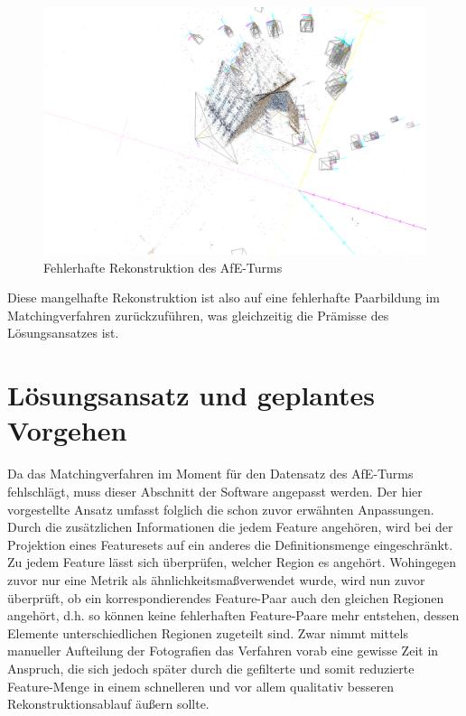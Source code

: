 \begin{figure}[h]
\centering
\includegraphics[height=0.3\textheight]{gfx/falscherekon1invert.png}
\caption[Fehlerhafte Rekonstruktion des AfE-Turms]{Fehlerhafte Rekonstruktion des AfE-Turms}
\label{gr:afeturmfehler}
\end{figure}
\FloatBarrier
Diese mangelhafte Rekonstruktion ist also auf eine fehlerhafte Paarbildung im Matchingverfahren zur\"uckzuf\"uhren, was gleichzeitig die Pr\"amisse des L\"osungsansatzes ist. 

\section{L\"osungsansatz und geplantes Vorgehen}
Da das Matchingverfahren im Moment f\"ur den Datensatz des AfE-Turms fehlschl\"agt, muss dieser Abschnitt der Software angepasst werden. Der hier vorgestellte Ansatz umfasst folglich die schon zuvor erw\"ahnten Anpassungen.\\
Durch die zus\"atzlichen Informationen die jedem Feature angeh\"oren, wird bei der Projektion eines Featuresets auf ein anderes die Definitionsmenge eingeschr\"ankt. Zu jedem Feature l\"asst sich \"uberpr\"ufen, welcher Region es angeh\"ort. Wohingegen zuvor nur eine Metrik als \"ahnlichkeitsma\ss  verwendet wurde, wird nun zuvor \"uberpr\"uft, ob ein korrespondierendes Feature-Paar auch den gleichen Regionen angeh\"ort, d.h. so k\"onnen keine fehlerhaften Feature-Paare mehr entstehen, dessen Elemente unterschiedlichen Regionen zugeteilt sind. Zwar nimmt mittels manueller Aufteilung der Fotografien das Verfahren vorab eine gewisse Zeit in Anspruch, die sich jedoch sp\"ater durch die gefilterte und somit reduzierte Feature-Menge in einem schnelleren und vor allem qualitativ besseren Rekonstruktionsablauf \"au\ss ern sollte.

